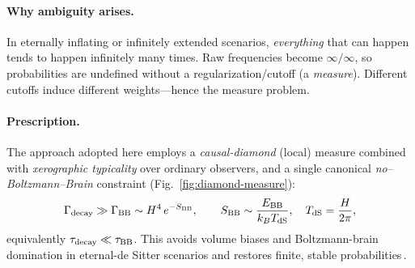 \documentclass[12pt]{article}
\theoremstyle{remark}
\begin{document}
\paragraph{Why ambiguity arises.} In eternally inflating or infinitely extended scenarios, \emph{everything} that can happen tends to happen infinitely many times. Raw frequencies become $\infty/\infty$, so probabilities are undefined without a regularization/cutoff (a \emph{measure}). Different cutoffs induce different weights---hence the measure problem.

\paragraph{Prescription.} The approach adopted here employs a \emph{causal-diamond} (local) measure combined with \emph{xerographic typicality} over ordinary observers, and a single canonical \emph{no--Boltzmann--Brain} constraint (Fig.~\ref{fig:diamond-measure}):
\begin{equation}
 \Gamma_{\rm decay} \gg \Gamma_{\rm BB} \sim H^4\,e^{-S_{\rm BB}},\qquad 
 S_{\rm BB}\sim \frac{E_{\rm BB}}{k_B T_{\rm dS}},\quad T_{\rm dS}=\frac{H}{2\pi},
\end{equation}
equivalently $\tau_{\rm decay}\ll \tau_{\rm BB}$. This avoids volume biases and Boltzmann-brain domination in eternal-de Sitter scenarios and restores finite, stable probabilities\,\cite{DysonKlebanSusskind2002,Page2007}.
\end{document}
